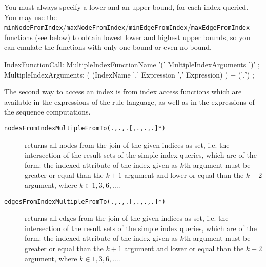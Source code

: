 You must always specify a lower and an upper bound, for each index queried. You may use the \texttt{minNodeFromIndex}/\texttt{maxNodeFromIndex}/\texttt{minEdgeFromIndex}/\texttt{maxEdgeFromIndex} functions (see below) to obtain lowest lower and highest upper bounds, so you can emulate the functions with only one bound or even no bound.

\begin{rail}
  IndexFunctionCall:
    MultipleIndexFunctionName '(' MultipleIndexArguments ')' ;
  MultipleIndexArguments: 
    ( (IndexName ',' Expression ',' Expression) ) + (',') ;
\end{rail}

The second way to access an index is from index access functions which are available in the expressions of the rule language, as well as in the expressions of the sequence computations.

\begin{description}
\item[\texttt{nodesFromIndexMultipleFromTo(.,.,.[,.,.,.]*)}] returns all nodes from the join of the given indices as set, i.e. the intersection of the result sets of the simple index queries, which are of the form: the indexed attribute of the index given as $k$th argument must be greater or equal than the $k + 1$ argument and lower or equal than the $k + 2$ argument, where $k \in 1, 3, 6, \ldots$.
\item[\texttt{edgesFromIndexMultipleFromTo(.,.,.[,.,.,.]*)}] returns all edges from the join of the given indices as set, i.e. the intersection of the result sets of the simple index queries, which are of the form: the indexed attribute of the index given as $k$th argument must be greater or equal than the $k + 1$ argument and lower or equal than the $k + 2$ argument, where $k \in 1, 3, 6, \ldots$.
\end{description}


